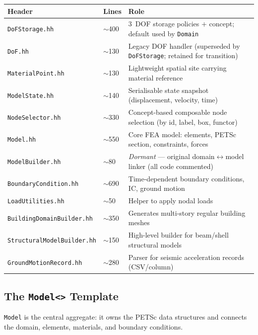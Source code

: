 \begin{center}
\small
\begin{tabular}{@{}llp{7.5cm}@{}}
\toprule
\textbf{Header} & \textbf{Lines} & \textbf{Role} \\
\midrule
\texttt{DoFStorage.hh}        & $\sim$400 & 3~DOF storage policies $+$ concept; default used by \texttt{Domain} \\
\texttt{DoF.hh}               & $\sim$130 & Legacy DOF handler (superseded by \texttt{DoFStorage}; retained for transition) \\
\texttt{MaterialPoint.hh}     & $\sim$130 & Lightweight spatial site carrying material reference \\
\texttt{ModelState.hh}         & $\sim$140 & Serialisable state snapshot (displacement, velocity, time) \\
\texttt{NodeSelector.hh}       & $\sim$330 & Concept-based composable node selection (by id, label, box, functor) \\
\texttt{Model.hh}              & $\sim$550 & Core FEA model: elements, PETSc section, constraints, forces \\
\texttt{ModelBuilder.hh}       & $\sim$80  & \emph{Dormant} --- original domain$\leftrightarrow$model linker (all code commented) \\
\texttt{BoundaryCondition.hh}  & $\sim$690 & Time-dependent boundary conditions, IC, ground motion \\
\texttt{LoadUtilities.hh}      & $\sim$50  & Helper to apply nodal loads \\
\texttt{BuildingDomainBuilder.hh} & $\sim$350 & Generates multi-story regular building meshes \\
\texttt{StructuralModelBuilder.hh} & $\sim$150 & High-level builder for beam/shell structural models \\
\texttt{GroundMotionRecord.hh} & $\sim$280 & Parser for seismic acceleration records (CSV/column) \\
\bottomrule
\end{tabular}
\end{center}


\subsection{The \texttt{Model<>} Template}
\label{sec:arch:model:model}

\texttt{Model} is the central aggregate: it owns the PETSc data structures
and connects the domain, elements, materials, and boundary conditions.

